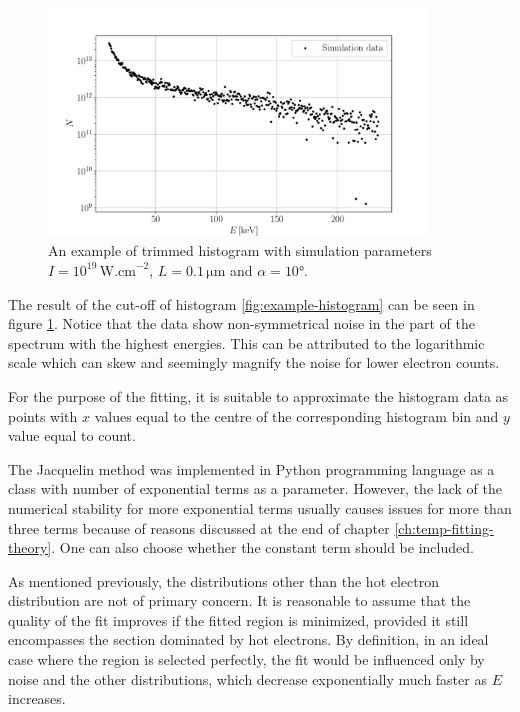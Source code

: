 \begin{figure}[h]
	\centering
	\includegraphics[width=0.9\textwidth]{figures/trimmed-hist}
	\caption{An example of trimmed histogram with simulation parameters $I=10^{19}\,\mathrm{W.cm}^{-2}$, $L=0.1\,\mathrm{\mu m}$ and $\alpha = 10$°.}
	\label{fig:trimmed-hist}
\end{figure}

The result of the cut-off of histogram \ref{fig:example-histogram} can be seen in figure \ref{fig:trimmed-hist}. Notice that the data show non-symmetrical noise in the part of the spectrum with the highest energies. This can be attributed to the logarithmic scale which can skew and seemingly magnify the noise for lower electron counts. 

For the purpose of the fitting, it is suitable to approximate the histogram data as points with $x$ values equal to the centre of the corresponding histogram bin and $y$ value equal to count.

The Jacquelin method was implemented in Python programming language as a class with number of exponential terms as a parameter. However, the lack of the numerical stability for more exponential terms usually causes issues for more than three terms because of reasons discussed at the end of chapter \ref{ch:temp-fitting-theory}. One can also choose whether the constant term should be included.

As mentioned previously, the distributions other than the hot electron distribution are not of primary concern. It is reasonable to assume that the quality of the fit improves if the fitted region is minimized, provided it still encompasses the section dominated by hot electrons. By definition, in an ideal case where the region is selected perfectly, the fit would be influenced only by noise and the other distributions, which decrease exponentially much faster as $E$ increases.

